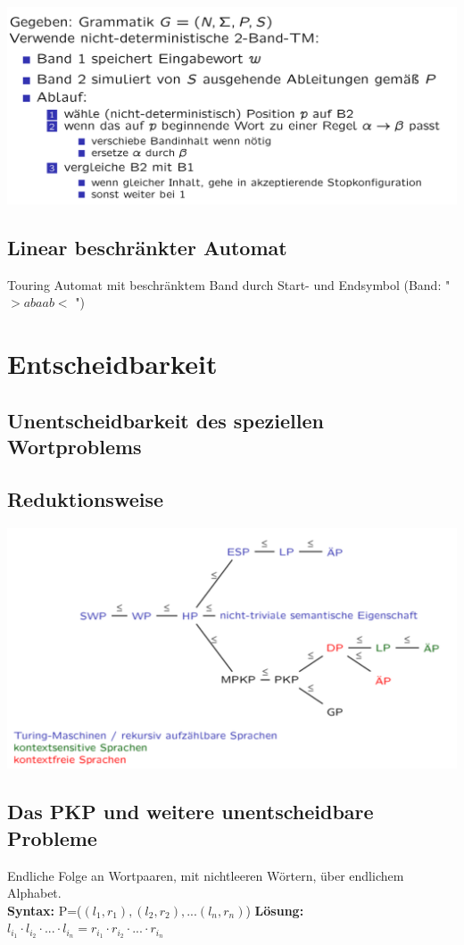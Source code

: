 \documentclass[12pt,a4paper]{article}
\begin{document}
	\begin{center}
	\includegraphics[width=\textwidth]{Bilder/Typ0Grammatik.png}
	\end{center}

	\subsection{Linear beschränkter Automat}
		Touring Automat mit beschränktem Band durch Start- und Endsymbol (Band: " $>abaab<$ ")


\section{Entscheidbarkeit}
	\subsection{Unentscheidbarkeit des speziellen Wortproblems}

	\subsection{Reduktionsweise}
	\includegraphics[scale=0.4]{Bilder/Zusammenfassung_Unentscheidbarkeiten.png}

	\subsection{Das PKP und weitere unentscheidbare Probleme}
	Endliche Folge an Wortpaaren, mit nichtleeren Wörtern, über endlichem Alphabet.\\
	\textbf{Syntax:} P=($(l_1, r_1), (l_2, r_2), ...(l_n, r_n)$) \hfill \textbf{Lösung:} $l_{i_1} \cdot l_{i_2} \cdot ... \cdot l_{i_n} = r_{i_1} \cdot r_{i_2} \cdot ... \cdot r_{i_n}$
\end{document}
